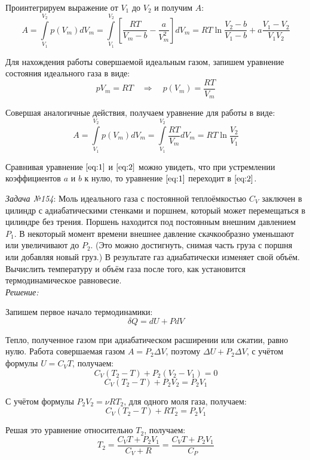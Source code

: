 \documentclass[14pt,final,titlepage,pscyr]{hedsemwork}
\begin{document}
Проинтегрируем выражение от \( V_1 \) до \( V_2 \) и получим \( A \):
\begin{equation}
	A = \int\limits_{V_1}^{V_2} p(V_m) dV_m = 
		\int\limits_{V_1}^{V_2} \left[ 
			\frac{RT}{V_m - b} - \frac{a}{V^2_m}
		\right] dV_m = 
		RT\ln\frac{V_2 - b}{V_1 - b} + a\frac{V_1 - V_2}{V_1 V_2}
	\label{eq:1}
\end{equation}

Для нахождения работы совершаемой идеальным газом, запишем уравнение 
состояния идеального газа в виде:
\[
	pV_m = RT \quad\Rightarrow\quad p(V_m) = \frac{RT}{V_m} 
\]

Совершая аналогичные действия, получаем уравнение для работы в виде:
\begin{equation}
	A = \int\limits_{V_1}^{V_2} p(V_m) dV_m = 
		\int\limits_{V_1}^{V_2} \frac{RT}{V_m} dV_m = 
		RT\ln\frac{V_2}{V_1}
	\label{eq:2}
\end{equation}

Сравнивая уравнение \( \ref{eq:1} \) и \( \ref{eq:2} \) можно увидеть, что 
при устремлении коэффициентов \( a \) и \( b \) к нулю, то уравнение 
\( \ref{eq:1} \) переходит в \( \ref{eq:2} \).

\newpage
\emph{Задача №154}: Моль идеального газа с постоянной теплоёмкостью 
\( C_V \) заключен в цилиндр с адиабатическими стенками и поршнем, который 
может перемещаться в цилиндре без трения. Поршень находится под постоянным 
внешним давлением \( P_1 \). В некоторый момент времени внешнее давление 
скачкообразно уменьшают или увеличивают до \( P_2 \). (Это можно 
достигнуть, снимая часть груза с поршня или добавляя новый груз.) В 
результате газ адиабатически изменяет свой объём. Вычислить температуру и 
объём газа после того, как установится термодинамическое равновесие. \\

\emph{Решение:}

Запишем первое начало термодинамики:
\[
	\delta Q = dU + PdV
\]

Тепло, полученное газом при адиабатическом расширении или сжатии, равно нулю. 
Работа совершаемая газом \( A = P_2 \Delta V \), поэтому 
\( \Delta U + P_2 \Delta V \), с учётом формулы \( U = C_V T \), получаем:
\[
	C_V( T_2 - T ) + P_2 ( V_2 - V_1 ) = 0
\]
\[
	C_V( T_2 - T ) + P_2 V_2 = P_2 V_1
\]

С учётом формулы \( P_2 V_2 = \nu RT_2 \), для одного моля газа, получаем:
\[
	C_V( T_2 - T ) + RT_2 = P_2 V_1
\]

Решая это уравнение относительно \( T_2 \), получаем:
\[
	T_2 = \frac{C_V T + P_2 V_1}{C_V + R} = \frac{C_V T + P_2 V_1}{C_P}
\]
\end{document}

